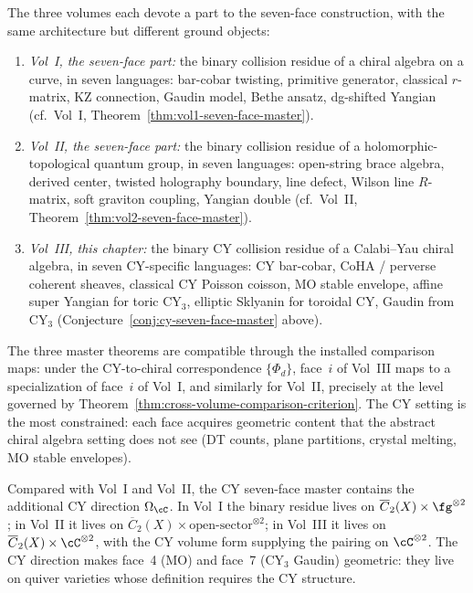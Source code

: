 \begin{remark}
\label{rem:three-seven-face-masters}
The three volumes each devote a part to the seven-face construction, with
the same architecture but different ground objects:
\begin{enumerate}[label=(\arabic*)]
\item \emph{Vol~I, the seven-face part:} the binary collision residue of a chiral
algebra on a curve, in seven languages: bar-cobar twisting, primitive
generator, classical $r$-matrix, KZ connection, Gaudin model, Bethe
ansatz, dg-shifted Yangian (cf.\ Vol~I,
Theorem~\ref{thm:vol1-seven-face-master}).
\item \emph{Vol~II, the seven-face part:} the binary collision residue of a
holomorphic-topological quantum group, in seven languages: open-string
brace algebra, derived center, twisted holography boundary, line
defect, Wilson line $R$-matrix, soft graviton coupling, Yangian double
(cf.\ Vol~II, Theorem~\ref{thm:vol2-seven-face-master}).
\item \emph{Vol~III, this chapter:} the binary CY collision residue of a
Calabi--Yau chiral algebra, in seven CY-specific languages: CY
bar-cobar, CoHA / perverse coherent sheaves, classical CY Poisson
coisson, MO stable envelope, affine super Yangian for toric CY$_3$,
elliptic Sklyanin for toroidal CY, Gaudin from CY$_3$
(Conjecture~\ref{conj:cy-seven-face-master} above).
\end{enumerate}
The three master theorems are compatible through the installed
comparison maps: under the CY-to-chiral correspondence
$\{\Phi_d\}$, face~$i$ of Vol~III maps to a specialization of face~$i$
of Vol~I, and similarly for Vol~II, precisely at the level governed by
Theorem~\ref{thm:cross-volume-comparison-criterion}. The CY setting is the most
constrained: each face acquires geometric content that the abstract
chiral algebra setting does not see (DT counts, plane partitions,
crystal melting, MO stable envelopes).
\end{remark}

\begin{remark}
\label{rem:cy-direction-new-slot}
Compared with Vol~I and Vol~II, the CY seven-face master contains the
additional CY direction $\Omega_\cC$. In Vol~I the
binary residue lives on $\overline{C}_2(X) \times \fg^{\otimes 2}$; in
Vol~II it lives on $\overline{C}_2(X) \times \mathrm{open\text{-}sector}^{\otimes 2}$;
in Vol~III it lives on $\overline{C}_2(X) \times \cC^{\otimes 2}$, with
the CY volume form supplying the pairing on $\cC^{\otimes 2}$. The CY
direction makes face~4 (MO) and face~7 (CY$_3$ Gaudin) geometric:
they live on quiver varieties whose definition requires the CY
structure.
\end{remark}

